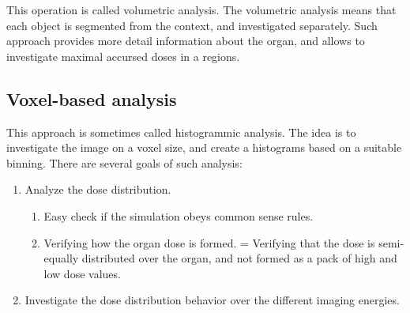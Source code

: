 \documentclass[fleqn,10pt]{SelfArx} %
\begin{document}
This operation is called volumetric analysis. The volumetric analysis means that each object is segmented from the context, and investigated separately. Such approach provides more detail information about the organ, and allows to investigate maximal accursed doses in a regions.

\subsection{Voxel-based analysis}




This approach is sometimes called histogrammic analysis. The idea is to investigate the image on a voxel size, and create a histograms based on a suitable binning. There are several goals of such analysis:

\begin{enumerate}[noitemsep]
\item Analyze the dose distribution.
\begin{enumerate}[noitemsep]
\item Easy check if the simulation obeys common sense rules.
\item Verifying how the organ dose is formed. = Verifying that the dose is semi-equally distributed over the organ, and not formed as a pack of high and low dose values.
\end{enumerate}
\item Investigate the dose distribution behavior over the different imaging energies.
\end{enumerate}


%
\end{document}
